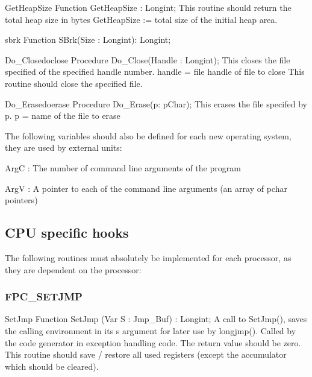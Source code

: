 \documentclass [a4paper,12pt]{article}
\begin{document}
\begin{function}{GetHeapSize}
\Declaration
Function GetHeapSize : Longint;
\Description
This routine should return the total heap size in bytes
\Parameters
\Algorithm
GetHeapSize := total size of the initial heap area.
\end{function}

\begin{function}{sbrk}
\Declaration
Function SBrk(Size : Longint): Longint;
\Description
\end{function}

\begin{procedurel}{Do{\_}Close}{doclose}
\Declaration
Procedure Do{\_}Close(Handle : Longint);
\Description
This closes the file specified of the specified handle number.
\Parameters
handle = file handle of file to close
\Notes
This routine should close the specified file.
\end{procedurel}

\begin{functionl}{Do{\_}Erase}{doerase}
\Declaration
Procedure Do{\_}Erase(p: pChar);
\Description
This erases the file specifed by p.
\Parameters
p = name of the file to erase
\Notes
\end{functionl}

The following variables should also be defined for each new operating
system, they are used by external units:

\noindent
ArgC : The number of command line arguments of the program

\noindent
ArgV : A pointer to each of the command line arguments (an array of pchar
pointers)

\subsection{CPU specific hooks}
\label{subsec:mylabel9}

The following routines must absolutely be implemented for each processor, as
they are dependent on the processor:

\subsubsection{FPC{\_}SETJMP}
\label{subsubsec:mylabel30}

\begin{function}{SetJmp}
\Declaration
Function SetJmp (Var S : Jmp{\_}Buf) : Longint;
\Description
A call to SetJmp(), saves the calling environment in its \textsf{s} argument
for later use by \textsf{longjmp()}. Called by the code generator in
exception handling code. The return value should be zero.
\Notes
This routine should save / restore all used registers (except the
accumulator which should be cleared).
\end{function}
\end{document}
